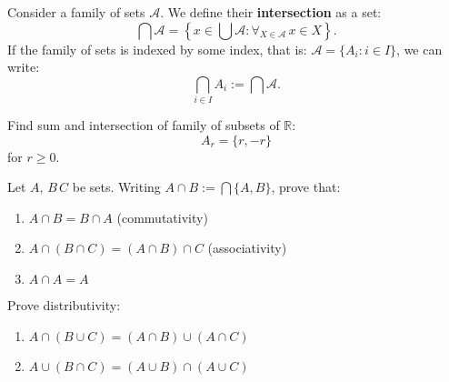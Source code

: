 \begin{definition}
  Consider a family of sets $\mathcal A$. We define their \textbf{intersection} as a set:
  $$\bigcap \mathcal A = \left\{x\in \bigcup \mathcal A : \forall_{X\in\mathcal A}\, x\in X\right\}.$$
  If the family of sets is indexed by some index, that is: $\mathcal A = \{A_i : i\in I\}$, we can write:
  $$\bigcap_{i\in I} A_i := \bigcap \mathcal A.$$
\end{definition}

\begin{exercise}
	Find sum and intersection of family of subsets of $\mathbb R$:
  $$A_r=\{r, -r\}$$ for $r\ge 0.$
\end{exercise}

\begin{exercise}
	Let $A,\,B\,C$ be sets. Writing $A\cap B := \bigcap \{A,B\}$, prove that:
	\begin{enumerate}
		\item $A\cap B=B\cap A$ (commutativity)
		\item $A\cap (B\cap C)=(A\cap B)\cap C$ (associativity)
    \item $A\cap A=A$
	\end{enumerate}
\end{exercise}

\begin{exercise}
  Prove distributivity:
  \begin{enumerate}
    \item $A\cap (B\cup C)=(A\cap B)\cup (A\cap C)$
    \item $A\cup (B\cap C)=(A\cup B)\cap (A\cup C)$
  \end{enumerate}
\end{exercise}

%


